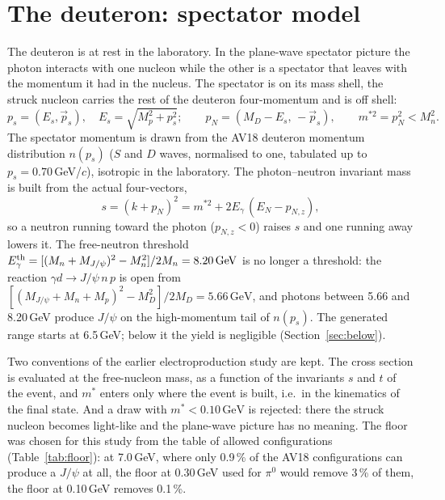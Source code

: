 \documentclass[11pt,a4paper]{article}
\newcommand{\Eg}{E_\gamma}
\newcommand{\jpsi}{J/\psi}
\newcommand{\GeV}{\,\mathrm{GeV}}
\newcommand{\ps}{p_s}
\begin{document}
\section{The deuteron: spectator model}
\label{sec:deuteron}

The deuteron is at rest in the laboratory.  In the plane-wave spectator picture the photon interacts
with one nucleon while the other is a spectator that leaves with the momentum it had in the nucleus.
The spectator is on its mass shell, the struck nucleon carries the rest of the deuteron four-momentum
and is off shell:
\begin{equation}
p_s=(E_s,\vec\ps),\quad E_s=\sqrt{M_p^2+\ps^2};\qquad
p_N=(M_D-E_s,\,-\vec\ps),\qquad m^{*2}=p_N^2<M_n^2 .
\end{equation}
The spectator momentum is drawn from the AV18 deuteron momentum distribution $n(\ps)$ ($S$ and $D$
waves, normalised to one, tabulated up to $\ps=0.70$\,GeV/$c$), isotropic in the laboratory.  The
photon--neutron invariant mass is built from the actual four-vectors,
\begin{equation}
s=(k+p_N)^2=m^{*2}+2\Eg\,(E_N-p_{N,z}),
\end{equation}
so a neutron running toward the photon ($p_{N,z}<0$) raises $s$ and one running away lowers it.  The
free-neutron threshold $\Eg^{\rm th}=[(M_n+M_{\jpsi})^2-M_n^2]/2M_n=8.20\GeV$ is no longer a
threshold: the reaction $\gamma d\to\jpsi\,n\,p$ is open from $[(M_{\jpsi}+M_n+M_p)^2-M_D^2]/2M_D
=5.66\GeV$, and photons between 5.66 and 8.20\,GeV produce $\jpsi$ on the high-momentum tail of
$n(\ps)$.  The generated range starts at 6.5\,GeV; below it the yield is negligible
(Section~\ref{sec:below}).

Two conventions of the earlier electroproduction study are kept.  The cross section is evaluated at the
free-nucleon mass, as a function of the invariants $s$ and $t$ of the event, and $m^*$ enters only
where the event is built, i.e.\ in the kinematics of the final state.  And a draw with
$m^*<0.10\GeV$ is rejected: there the struck nucleon becomes light-like and the plane-wave picture
has no meaning.  The floor was chosen for this study from the table of allowed configurations
(Table~\ref{tab:floor}): at 7.0\,GeV, where only 0.9\,\% of the AV18 configurations can produce a
$\jpsi$ at all, the floor at 0.30\,GeV used for $\pi^0$ would remove 3\,\% of them, the floor at
0.10\,GeV removes 0.1\,\%.
\end{document}
